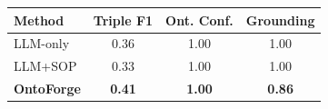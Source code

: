 \begin{tabular}{lccc}
\toprule
Method & Triple F1 & Ont. Conf. & Grounding \\
\midrule
LLM-only & 0.36 & 1.00 & 1.00 \\
LLM+SOP & 0.33 & 1.00 & 1.00 \\
\midrule
\textbf{OntoForge} & \textbf{0.41} & \textbf{1.00} & \textbf{0.86} \\
\bottomrule
\end{tabular}
